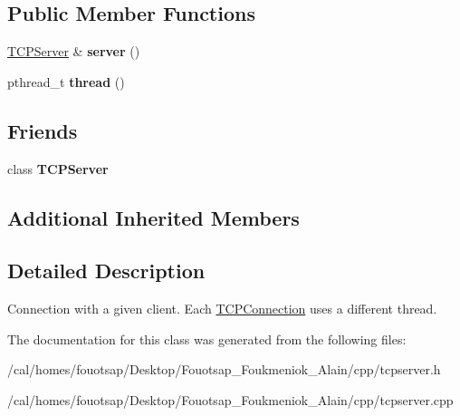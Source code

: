 \subsection*{Public Member Functions}
\begin{DoxyCompactItemize}
\item 
\hypertarget{classcppu_1_1_t_c_p_connection_a4186946c7c22e3c2cebe3a97aa78f5f7}{\hyperlink{classcppu_1_1_t_c_p_server}{T\+C\+P\+Server} \& {\bfseries server} ()}\label{classcppu_1_1_t_c_p_connection_a4186946c7c22e3c2cebe3a97aa78f5f7}

\item 
\hypertarget{classcppu_1_1_t_c_p_connection_a4663875b80fced790502880c72e6e672}{pthread\+\_\+t {\bfseries thread} ()}\label{classcppu_1_1_t_c_p_connection_a4663875b80fced790502880c72e6e672}

\end{DoxyCompactItemize}
\subsection*{Friends}
\begin{DoxyCompactItemize}
\item 
\hypertarget{classcppu_1_1_t_c_p_connection_ae4cfdb1814d91a8d28dadb49adda68f0}{class {\bfseries T\+C\+P\+Server}}\label{classcppu_1_1_t_c_p_connection_ae4cfdb1814d91a8d28dadb49adda68f0}

\end{DoxyCompactItemize}
\subsection*{Additional Inherited Members}


\subsection{Detailed Description}
Connection with a given client. Each \hyperlink{classcppu_1_1_t_c_p_connection}{T\+C\+P\+Connection} uses a different thread. 

The documentation for this class was generated from the following files\+:\begin{DoxyCompactItemize}
\item 
/cal/homes/fouotsap/\+Desktop/\+Fouotsap\+\_\+\+Foukmeniok\+\_\+\+Alain/cpp/tcpserver.\+h\item 
/cal/homes/fouotsap/\+Desktop/\+Fouotsap\+\_\+\+Foukmeniok\+\_\+\+Alain/cpp/tcpserver.\+cpp\end{DoxyCompactItemize}
